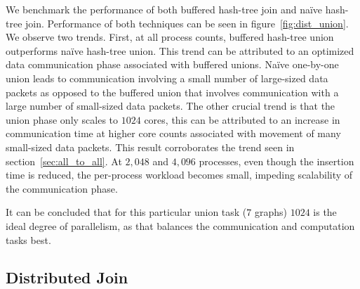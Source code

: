 We benchmark the performance of both buffered hash-tree join and na\"ive hash-tree join. 
Performance of both techniques can be seen in figure~\ref{fig:dist_union}. We observe two trends. First, at all process counts, buffered hash-tree union outperforms na\"ive hash-tree union. This trend can be attributed to an optimized data communication phase associated with buffered unions. Na\"ive one-by-one union leads to communication involving a small number of large-sized data packets as opposed to the buffered union that involves communication with a large number of small-sized data packets. 
The other crucial trend is that the union phase only scales to $1024$ cores, this can be attributed to an increase in communication time at higher core counts associated with movement of many small-sized data packets. This result corroborates the trend seen in section~\ref{sec:all_to_all}. At $2,\!048$ and $4,\!096$ processes, even though the insertion time is reduced, the per-process workload becomes small, impeding scalability of the communication phase.

It can be concluded that for this particular union task ($7$ graphs) $1024$ is the ideal degree of parallelism, as that balances the communication and computation tasks best.





\subsection{Distributed Join}
\label{sec:join}

